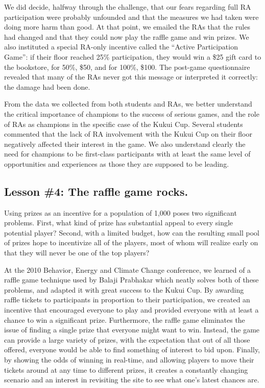 \documentclass{acm_proc_article-sp}
\begin{document}
We did decide, halfway through the challenge, that our fears regarding full RA participation were probably unfounded and that the measures we had taken were doing more harm than good.  At that point, we emailed the RAs that the rules had changed and that they could now play the raffle game and win prizes.  We also instituted a special RA-only incentive called the ``Active Participation Game'':   if their floor reached 25\% participation, they would win a \$25 gift card to the bookstore, for 50\%, \$50, and for 100\%, \$100.   The post-game questionnaire revealed that many of the RAs never got this message or interpreted it correctly: the damage had been done.

From the data we collected from both students and RAs, we better understand the critical importance of champions to the success of serious games, and the role of RAs as champions in the specific case of the Kukui Cup.  Several students commented that the lack of RA involvement with the Kukui Cup on their floor negatively affected their interest in the game.  We also understand clearly the need for champions to be first-class participants with at least the same level of opportunities and experiences as those they are supposed to be leading.

\subsection{Lesson \#4: The raffle game rocks.}

Using prizes as an incentive for a population of 1,000 poses two significant problems.  First, what kind of prize has substantial appeal to every single potential player?  Second, with a limited budget, how can the resulting small pool of prizes hope to incentivize all of the players, most of whom will realize early on that they will never be one of the top players?

At the 2010 Behavior, Energy and Climate Change conference, we learned of a raffle game technique used by Balaji Prabhakar which neatly solves both of these problems, and adapted it with great success to the Kukui Cup.  By awarding raffle tickets to participants in proportion to their participation, we created an incentive that encouraged everyone to play and provided everyone with at least a chance to win a significant prize.   Furthermore, the raffle game eliminates the issue of finding a single prize that everyone might want to win. Instead, the game can provide a large variety of prizes, with the expectation that out of all those offered, everyone would be able to find something of interest to bid upon.  Finally, by showing the odds of winning in real-time, and allowing players to move their tickets around at any time to different prizes, it creates a constantly changing scenario and an interest in revisiting the site to see what one's latest chances are. 
\end{document}
